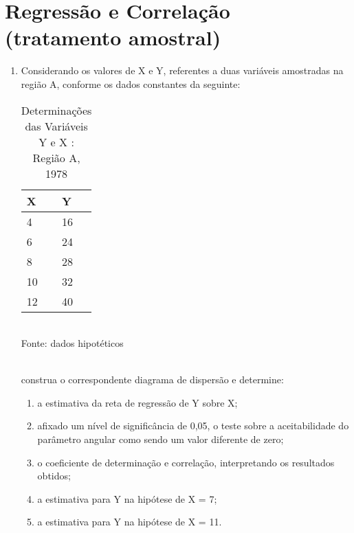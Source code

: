 \chapter{Regressão e Correlação (tratamento amostral) }

\begin{enumerate}[resume]

\item Considerando os valores de X e Y, referentes a duas variáveis amostradas na região A, conforme os dados constantes da seguinte:
	\begin{table}[!htb]
	\centering
	\caption{Determinações das Variáveis Y e X : Região A, 1978}
	\vspace{0.5cm}
	\begin{tabular}{ll}
	X & Y \\
	\hline 
	4 & 16  \\
	6 & 24  \\
	8 & 28 \\
	10 & 32  \\
	12 & 40  \\
	\end{tabular}\\
	Fonte: dados hipotéticos\\
	\end{table}\\	
	construa o correspondente diagrama de dispersão e determine:
	\begin{enumerate}
	\item a estimativa da reta de regressão de Y sobre X;
	\item afixado um nível de significância de 0,05, o teste sobre a aceitabilidade do parâmetro angular como sendo um valor diferente de zero;
	\item o coeficiente de determinação e correlação, interpretando os resultados obtidos;
	\item	a estimativa para Y na hipótese de X = 7;
	\item	a estimativa para Y na hipótese de X = 11.
	\end{enumerate}


\end{enumerate}
